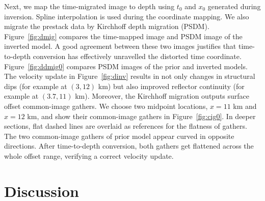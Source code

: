 Next, we map the time-migrated image to depth using $t_0$ and $x_0$ generated during inversion. Spline 
interpolation \cite[]{press} is used during the coordinate mapping. We also migrate the 
prestack data by Kirchhoff depth migration \cite[]{li2} (PSDM). Figure~\ref{fig:dmig} compares the 
time-mapped image and PSDM image of the inverted model. A good agreement between these two images justifies that 
time-to-depth conversion has effectively unravelled the distorted time coordinate. Figure~\ref{fig:ddmig0} compares 
PSDM images of the prior and inverted models. The velocity update in Figure~\ref{fig:dinv} results in not only 
changes in structural dips (for example at $(3,12)$ km) but also improved reflector continuity (for example at 
$(3.7,11)$ km). Moreover, the Kirchhoff migration outputs surface offset common-image 
gathers. We choose two midpoint locations, $x = 11$ km and $x = 12$ km, 
and show their common-image gathers in Figure~\ref{fig:cig0}. In deeper sections, flat dashed lines are 
overlaid as references for the 
flatness of gathers. The two common-image gathers of prior model appear curved in opposite directions. After 
time-to-depth conversion, both gathers get flattened across the whole offset range, 
verifying a correct velocity update.

\section{Discussion}


